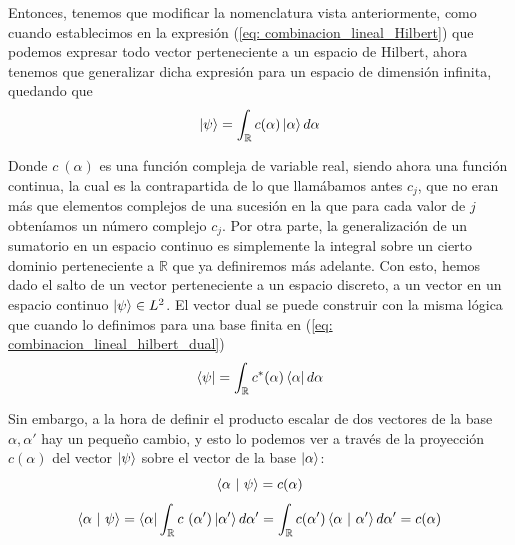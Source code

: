 \documentclass{article}
\numberwithin{equation}{section} %
\begin{document}
    \vspace{2.5mm}

    Entonces, tenemos que modificar la nomenclatura vista anteriormente, como cuando establecimos en la expresión (\ref{eq: combinacion_lineal_Hilbert}) que podemos expresar todo vector perteneciente a un espacio de Hilbert, ahora tenemos que generalizar dicha expresión para un espacio de dimensión infinita, quedando que
    \begin{equation}
        \ket{\psi} = \int_{\mathbb{R}} c (\alpha) \ket{\alpha} d \alpha
    \end{equation}

    \vspace{2.5mm}

    Donde \( c \ (\alpha) \) es una función compleja de variable real, siendo ahora una función continua, la cual es la contrapartida de lo que llamábamos antes \( c_{j} \), que no eran más que elementos complejos de una sucesión en la que para cada valor de \( j \) obteníamos un número complejo \( c_{j} \). Por otra parte, la generalización de un sumatorio en un espacio continuo es simplemente la integral sobre un cierto dominio perteneciente a \( \mathbb{R} \) que ya definiremos más adelante. Con esto, hemos dado el salto de un vector perteneciente a un espacio discreto, a un vector en un espacio continuo \( \ket{\psi} \in L^{2} \). El vector dual se puede construir con la misma lógica que cuando lo definimos para una base finita en (\ref{eq: combinacion_lineal_hilbert_dual})
    \begin{equation}
        \bra{\psi} = \int_{\mathbb{R}} c^{*} (\alpha) \bra{\alpha} d \alpha
    \end{equation}

    \vspace{2.5mm}

    Sin embargo, a la hora de definir el producto escalar de dos vectores de la base \( \alpha, \alpha' \) hay un pequeño cambio, y esto lo podemos ver a través de la proyección \( c (\alpha) \) del vector \( \ket{\psi} \) sobre el vector de la base \( \ket{\alpha} \):
    \begin{equation*}
        \braket{\alpha \ | \ \psi} = c (\alpha) 
    \end{equation*}
    \begin{equation*}
        \braket{\alpha \ | \ \psi} = \bra{\alpha} \int_{\mathbb{R}} c \ (\alpha') \ket{\alpha'} d \alpha' = \int_{\mathbb{R}} c (\alpha') \braket{\alpha \ | \ \alpha'} d \alpha' = c (\alpha)
    \end{equation*}
\end{document}
